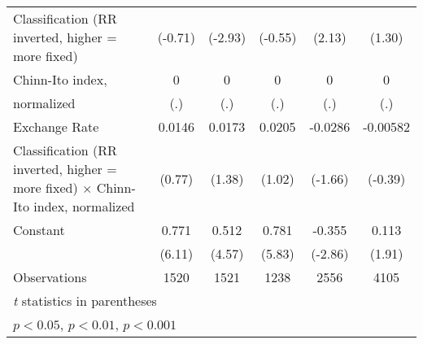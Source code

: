 {\begin{tabular}{l*{5}{c}}
Classification (RR inverted, higher = more fixed)&     (-0.71)         &     (-2.93)         &     (-0.55)         &      (2.13)         &      (1.30)         \\
[1em]
Chinn-Ito index,    &           0         &           0         &           0         &           0         &           0         \\
normalized          &         (.)         &         (.)         &         (.)         &         (.)         &         (.)         \\
[1em]
Exchange Rate       &      0.0146         &      0.0173         &      0.0205         &     -0.0286         &    -0.00582         \\
Classification (RR inverted, higher = more fixed) $\times$ Chinn-Ito index, normalized&      (0.77)         &      (1.38)         &      (1.02)         &     (-1.66)         &     (-0.39)         \\
[1em]
Constant            &       0.771\sym{***}&       0.512\sym{***}&       0.781\sym{***}&      -0.355\sym{**} &       0.113         \\
                    &      (6.11)         &      (4.57)         &      (5.83)         &     (-2.86)         &      (1.91)         \\
\hline
Observations        &        1520         &        1521         &        1238         &        2556         &        4105         \\
\hline\hline
\multicolumn{6}{l}{\footnotesize \textit{t} statistics in parentheses}\\
\multicolumn{6}{l}{\footnotesize \sym{*} \(p<0.05\), \sym{**} \(p<0.01\), \sym{***} \(p<0.001\)}\\
\end{tabular}
}
